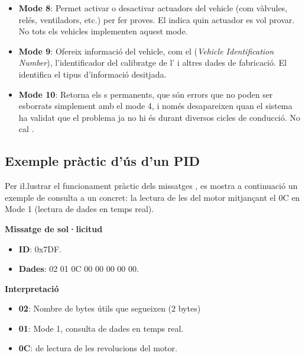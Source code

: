 \documentclass{tfgitic}[2024/07/01]
\begin{document}
\begin{itemize}
  \item \textbf{Mode 8}: Permet activar o desactivar actuadors del vehicle (com vàlvules, relés, ventiladors, etc.) per fer proves. El  indica 
  quin actuador es vol provar. No tots els vehicles implementen aquest mode.
  
  \item \textbf{Mode 9}: Ofereix informació del vehicle, com el  (\textit{Vehicle Identification Number}), l'identificador del calibratge de l' i altres dades 
  de fabricació. El  identifica el tipus d'informació desitjada.
  
  \item \textbf{Mode 10}: Retorna els s permanents, que són errors que no poden ser esborrats simplement amb el mode 4, i només desapareixen 
  quan el sistema ha validat que el problema ja no hi és durant diversos cicles de conducció. No cal . 
\end{itemize} 

\subsection{Exemple pràctic d'ús d'un PID}

Per i\l.lustrar el funcionament pràctic dels missatges , es mostra a continuació un exemple de consulta a un  concret: la lectura de les  del motor 
mitjançant el  0C en Mode 1 (lectura de dades en temps real).

\textbf{Missatge de sol·licitud}

\begin{itemize}
  \item \textbf{ID}: 0x7DF.
  
  \item \textbf{Dades}: 02 01 0C 00 00 00 00 00.
\end{itemize} 

\textbf{Interpretació}

\begin{itemize}
  \item \textbf{02}: Nombre de bytes útils que segueixen (2 bytes)
  
  \item \textbf{01}: Mode 1, consulta de dades en temps real.
  
  \item \textbf{0C}:  de lectura de les revolucions del motor.
\end{itemize} 
\end{document}
